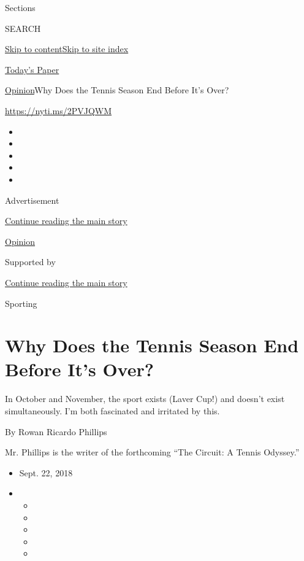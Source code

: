 Sections

SEARCH

\protect\hyperlink{site-content}{Skip to
content}\protect\hyperlink{site-index}{Skip to site index}

\href{https://myaccount.nytimes.com/auth/login?response_type=cookie\&client_id=vi}{}

\href{https://www.nytimes.com/section/todayspaper}{Today's Paper}

\href{/section/opinion}{Opinion}\textbar{}Why Does the Tennis Season End
Before It's Over?

\href{https://nyti.ms/2PVJQWM}{https://nyti.ms/2PVJQWM}

\begin{itemize}
\item
\item
\item
\item
\item
\end{itemize}

Advertisement

\protect\hyperlink{after-top}{Continue reading the main story}

\href{/section/opinion}{Opinion}

Supported by

\protect\hyperlink{after-sponsor}{Continue reading the main story}

Sporting

\hypertarget{why-does-the-tennis-season-end-before-its-over}{%
\section{Why Does the Tennis Season End Before It's
Over?}\label{why-does-the-tennis-season-end-before-its-over}}

In October and November, the sport exists (Laver Cup!) and doesn't exist
simultaneously. I'm both fascinated and irritated by this.

By Rowan Ricardo Phillips

Mr. Phillips is the writer of the forthcoming ``The Circuit: A Tennis
Odyssey.''

\begin{itemize}
\item
  Sept. 22, 2018
\item
  \begin{itemize}
  \item
  \item
  \item
  \item
  \item
  \end{itemize}
\end{itemize}

